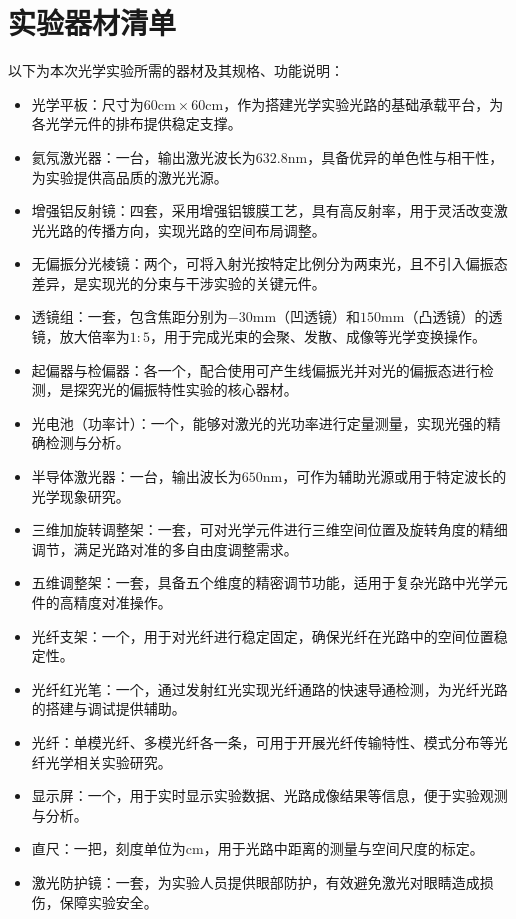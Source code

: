 \documentclass[11pt]{article}
\begin{document}
\section{实验器材清单}
以下为本次光学实验所需的器材及其规格、功能说明：
\begin{itemize}
    \item 光学平板：尺寸为\(60\mathrm{cm} \times 60\mathrm{cm}\)，作为搭建光学实验光路的基础承载平台，为各光学元件的排布提供稳定支撑。
    \item 氦氖激光器：一台，输出激光波长为\(632.8\mathrm{nm}\)，具备优异的单色性与相干性，为实验提供高品质的激光光源。
    \item 增强铝反射镜：四套，采用增强铝镀膜工艺，具有高反射率，用于灵活改变激光光路的传播方向，实现光路的空间布局调整。
    \item 无偏振分光棱镜：两个，可将入射光按特定比例分为两束光，且不引入偏振态差异，是实现光的分束与干涉实验的关键元件。
    \item 透镜组：一套，包含焦距分别为\(-30\mathrm{mm}\)（凹透镜）和\(150\mathrm{mm}\)（凸透镜）的透镜，放大倍率为\(1:5\)，用于完成光束的会聚、发散、成像等光学变换操作。
    \item 起偏器与检偏器：各一个，配合使用可产生线偏振光并对光的偏振态进行检测，是探究光的偏振特性实验的核心器材。
    \item 光电池（功率计）：一个，能够对激光的光功率进行定量测量，实现光强的精确检测与分析。
    \item 半导体激光器：一台，输出波长为\(650\mathrm{nm}\)，可作为辅助光源或用于特定波长的光学现象研究。
    \item 三维加旋转调整架：一套，可对光学元件进行三维空间位置及旋转角度的精细调节，满足光路对准的多自由度调整需求。
    \item 五维调整架：一套，具备五个维度的精密调节功能，适用于复杂光路中光学元件的高精度对准操作。
    \item 光纤支架：一个，用于对光纤进行稳定固定，确保光纤在光路中的空间位置稳定性。
    \item 光纤红光笔：一个，通过发射红光实现光纤通路的快速导通检测，为光纤光路的搭建与调试提供辅助。
    \item 光纤：单模光纤、多模光纤各一条，可用于开展光纤传输特性、模式分布等光纤光学相关实验研究。
    \item 显示屏：一个，用于实时显示实验数据、光路成像结果等信息，便于实验观测与分析。
    \item 直尺：一把，刻度单位为\(\mathrm{cm}\)，用于光路中距离的测量与空间尺度的标定。
    \item 激光防护镜：一套，为实验人员提供眼部防护，有效避免激光对眼睛造成损伤，保障实验安全。
\end{itemize}
\end{document}
